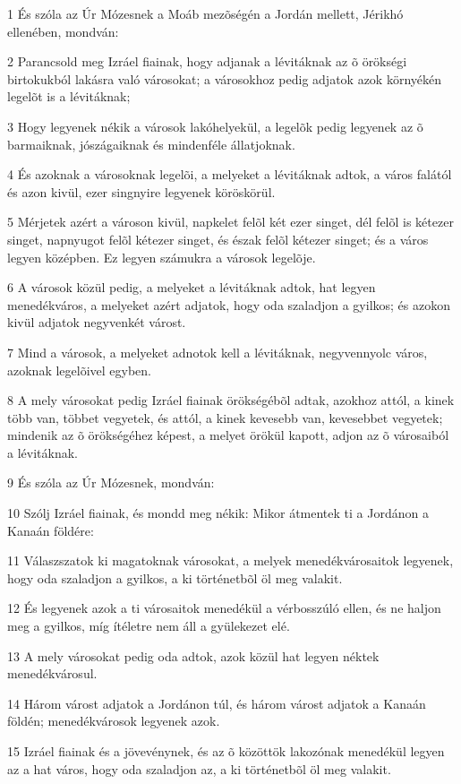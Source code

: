 \par 1 És szóla az Úr Mózesnek a Moáb mezõségén a Jordán mellett, Jérikhó ellenében, mondván:
\par 2 Parancsold meg Izráel fiainak, hogy adjanak a lévitáknak az õ örökségi birtokukból lakásra való városokat; a városokhoz pedig adjatok azok környékén legelõt is a lévitáknak;
\par 3 Hogy legyenek nékik a városok lakóhelyekül, a legelõk pedig legyenek az õ barmaiknak, jószágaiknak és mindenféle állatjoknak.
\par 4 És azoknak a városoknak legelõi, a melyeket a lévitáknak adtok, a város falától és azon kivül, ezer singnyire legyenek köröskörül.
\par 5 Mérjetek azért a városon kivül, napkelet felõl két ezer singet, dél felõl is kétezer singet, napnyugot felõl kétezer singet, és észak felõl kétezer singet; és a város legyen középben. Ez legyen számukra a városok legelõje.
\par 6 A városok közül pedig, a melyeket a lévitáknak adtok, hat legyen menedékváros, a melyeket azért adjatok, hogy oda szaladjon a gyilkos; és  azokon kivül adjatok negyvenkét várost.
\par 7 Mind a városok, a melyeket adnotok kell a lévitáknak, negyvennyolc város, azoknak legelõivel egyben.
\par 8 A mely városokat pedig Izráel fiainak örökségébõl adtak, azokhoz attól, a kinek több van, többet vegyetek, és attól, a kinek kevesebb van, kevesebbet vegyetek; mindenik az õ örökségéhez képest, a melyet örökül kapott, adjon az õ városaiból a lévitáknak.
\par 9 És szóla az Úr Mózesnek, mondván:
\par 10 Szólj Izráel fiainak, és mondd meg nékik: Mikor átmentek ti a Jordánon a Kanaán földére:
\par 11 Válaszszatok ki magatoknak városokat, a melyek menedékvárosaitok legyenek, hogy oda szaladjon a gyilkos, a ki  történetbõl öl meg valakit.
\par 12 És legyenek azok a ti városaitok menedékül a vérbosszúló ellen, és ne haljon meg a gyilkos, míg ítéletre nem áll a gyülekezet elé.
\par 13 A mely városokat pedig oda adtok, azok közül hat legyen néktek menedékvárosul.
\par 14 Három várost adjatok a Jordánon túl, és három várost adjatok a Kanaán földén; menedékvárosok legyenek azok.
\par 15 Izráel fiainak és a jövevénynek, és az õ közöttök lakozónak menedékül legyen az a hat város, hogy oda szaladjon az, a ki  történetbõl öl meg valakit.
